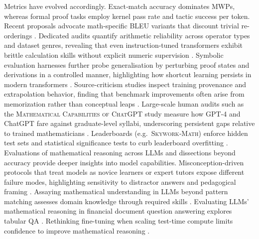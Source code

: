 \documentclass[acmsmall,anonymous]{acmart}
\begin{document}
Metrics have evolved accordingly.  Exact‐match accuracy dominates MWPs, whereas formal proof tasks employ kernel pass rate and tactic success per token.  Recent proposals advocate math‐specific BLEU variants that discount trivial re-orderings \cite{li2024benchmarkingllmmath}. Dedicated audits quantify arithmetic reliability across operator types and dataset genres, revealing that even instruction-tuned transformers exhibit brittle calculation skills without explicit numeric supervision \cite{yuan-2023-arithmetic-eval}.  Symbolic evaluation harnesses further probe generalisation by perturbing proof states and derivations in a controlled manner, highlighting how shortcut learning persists in modern transformers \cite{meadows-2024-symbolic-framework}.  Source-criticism studies inspect training provenance and extrapolation behavior, finding that benchmark improvements often arise from memorization rather than conceptual leaps \cite{yousefzadeh-2023-source-criticism}.  Large-scale human audits such as the \textsc{Mathematical Capabilities of ChatGPT} study measure how GPT-4 and ChatGPT fare against graduate-level syllabi, underscoring persistent gaps relative to trained mathematicians \cite{frieder-2023-math-capabilities}.  Leaderboards (e.g.\ \textsc{Skywork‐Math}) enforce hidden test sets and statistical significance tests to curb leaderboard overfitting \cite{zeng2024skywork}. Evaluations of mathematical reasoning across LLMs \cite{anonymous2025evaluatingmathreasoning,anonymous2025evaluationmathsolving,anonymous2025evaluationmathsolving,anonymous2025evaluatingmathreasoning} and dissections beyond accuracy \cite{anonymous2025beyondaccuracy,anonymous2025beyondaccuracy} provide deeper insights into model capabilities. Misconception-driven protocols that treat models as novice learners or expert tutors expose different failure modes, highlighting sensitivity to distractor answers and pedagogical framing \cite{liu-2023-novice-expert}. Assaying mathematical understanding in LLMs beyond pattern matching assesses domain knowledge through required skills \cite{guo2024learning}. Evaluating LLMs' mathematical reasoning in financial document question answering explores tabular QA \cite{srivastava2024evaluating}. Rethinking fine-tuning when scaling test-time compute limits confidence to improve mathematical reasoning \cite{chen2025a}.
\end{document}
